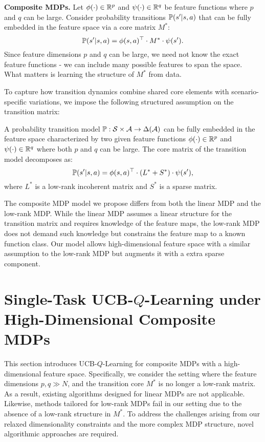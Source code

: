 \smallskip
\noindent
\textbf{Composite MDPs.}
Let $\phi(\cdot) \in \mathbb{R}^p$ and $\psi(\cdot) \in \mathbb{R}^q$ be feature functions where $p$ and $q$ can be large.
Consider probability transitions $\mathbb{P}(s' | s, a)$ that can be fully embedded in the feature space via a core matrix $M^*$:
\[\mathbb{P}(s' | s, a) = \phi(s, a)^\top \cdot M^* \cdot \psi(s').\]
Since feature dimensions $p$ and $q$ can be large, we need not know the exact feature functions - we can include many possible features to span the space. What matters is learning the structure of $M^*$ from data.

To capture how transition dynamics combine shared core elements with scenario-specific variations, we impose the following structured assumption on the transition matrix:
\begin{definition} \label{ass:matrix}
A probability transition model $\mathbb{P}:{\cal S}\times{\cal A}\rightarrow\Delta({\cal A})$ can be fully embedded in the feature space characterized by two given feature functions $\phi(\cdot) \in \mathbb{R}^p$ and $\psi(\cdot) \in \mathbb{R}^q$ where both $p$ and $q$ can be large. The core matrix of the transition model decomposes as:
\[
\mathbb{P}(s' | s, a) = \phi(s, a)^\top \cdot ( L^* +  S^*) \cdot \psi(s'),
\]
where  $ L^*$ is a low-rank incoherent matrix and $ S^*$ is a sparse matrix.
\end{definition}

\begin{remark}
The composite MDP model we propose differs from both the linear MDP and the low-rank MDP. While the linear MDP assumes a linear structure for the transition matrix and requires knowledge of the feature maps, the low-rank MDP does not demand such knowledge but constrains the feature map to a known function class. Our model allows high-dimensional feature space with a similar assumption to the low-rank MDP but augments it with a extra sparse component.
\end{remark}



\section{Single-Task UCB-$Q$-Learning under High-Dimensional Composite MDPs}
\label{sec:single-task}
This section introduces UCB-$Q$-Learning for composite MDPs with a high-dimensional feature space. Specifically, we consider the setting where the feature dimensions $p, q \gg N$, and the transition core $M^*$ is no longer a low-rank matrix. As a result, existing algorithms designed for linear MDPs are not applicable. Likewise, methods tailored for low-rank MDPs fail in our setting due to the absence of a low-rank structure in $M^*$. To address the challenges arising from our relaxed dimensionality constraints and the more complex MDP structure, novel algorithmic approaches are required.

